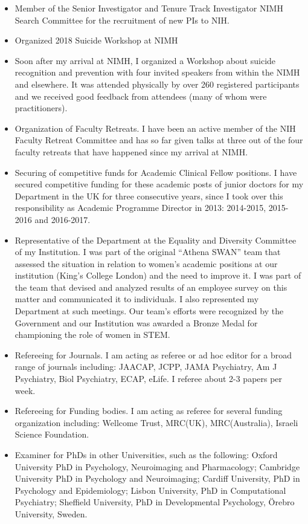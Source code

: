 \documentclass[
]{article}
\begin{document}
\begin{itemize}
\item
  Member of the Senior Investigator and Tenure Track Investigator NIMH
  Search Committee for the recruitment of new PIs to NIH.
\item
  Organized 2018 Suicide Workshop at NIMH
\item
  Soon after my arrival at NIMH, I organized a Workshop about suicide
  recognition and prevention with four invited speakers from within the
  NIMH and elsewhere. It was attended physically by over 260 registered
  participants and we received good feedback from attendees (many of
  whom were practitioners).
\item
  Organization of Faculty Retreats. I have been an active member of the
  NIH Faculty Retreat Committee and has so far given talks at three out
  of the four faculty retreats that have happened since my arrival at
  NIMH.
\item
  Securing of competitive funds for Academic Clinical Fellow positions.
  I have secured competitive funding for these academic posts of junior
  doctors for my Department in the UK for three consecutive years, since
  I took over this responsibility as Academic Programme Director in
  2013: 2014-2015, 2015-2016 and 2016-2017.
\item
  Representative of the Department at the Equality and Diversity
  Committee of my Institution. I was part of the original ``Athena
  SWAN'' team that assessed the situation in relation to women's
  academic positions at our institution (King's College London) and the
  need to improve it. I was part of the team that devised and analyzed
  results of an employee survey on this matter and communicated it to
  individuals. I also represented my Department at such meetings. Our
  team's efforts were recognized by the Government and our Institution
  was awarded a Bronze Medal for championing the role of women in STEM.
\item
  Refereeing for Journals. I am acting as referee or ad hoc editor for a
  broad range of journals including: JAACAP, JCPP, JAMA Psychiatry, Am J
  Psychiatry, Biol Psychiatry, ECAP, eLife. I referee about 2-3 papers
  per week.
\item
  Refereeing for Funding bodies. I am acting as referee for several
  funding organization including: Wellcome Trust, MRC(UK),
  MRC(Australia), Israeli Science Foundation.
\item
  Examiner for PhDs in other Universities, such as the following: Oxford
  University PhD in Psychology, Neuroimaging and Pharmacology; Cambridge
  University PhD in Psychology and Neuroimaging; Cardiff University, PhD
  in Psychology and Epidemiology; Lisbon University, PhD in
  Computational Psychiatry; Sheffield University, PhD in Developmental
  Psychology, Örebro University, Sweden.
\end{itemize}
\end{document}

